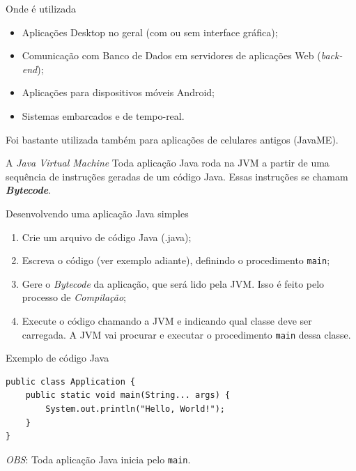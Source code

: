 \documentclass{beamer}
\begin{document}
\begin{frame}{Onde é utilizada}
    \begin{itemize}
        \item Aplicações Desktop no geral (com ou sem interface gráfica);
        \item Comunicação com Banco de Dados em servidores de aplicações Web
            (\textit{back-end});
        \item Aplicações para dispositivos móveis Android;
        \item Sistemas embarcados e de tempo-real.
    \end{itemize}

    Foi bastante utilizada também para aplicações de celulares antigos (JavaME).
\end{frame}


\begin{frame}{A \textit{Java Virtual Machine}}
    Toda aplicação Java roda na JVM a partir de uma sequência de instruções
    geradas de um código Java. Essas instruções se chamam
    \textbf{\textit{Bytecode}}.
\end{frame}


\begin{frame}{Desenvolvendo uma aplicação Java simples}
    \begin{enumerate}
        \item Crie um arquivo de código Java (.java);
        \item Escreva o código (ver exemplo adiante), definindo o procedimento
            \texttt{main};
        \item Gere o \textit{Bytecode} da aplicação, que será lido pela JVM.
            Isso é feito pelo processo de \emph{Compilação};
        \item Execute o código chamando a JVM e indicando qual classe deve ser
            carregada. A JVM vai procurar e executar o procedimento
            \texttt{main} dessa classe.
    \end{enumerate}
\end{frame}


\begin{frame}[fragile]{Exemplo de código Java}
    \begin{verbatim}
public class Application {
    public static void main(String... args) {
        System.out.println("Hello, World!");
    }
}
    \end{verbatim}

    \emph{OBS}: Toda aplicação Java inicia pelo \texttt{main}.
\end{frame}
\end{document}

